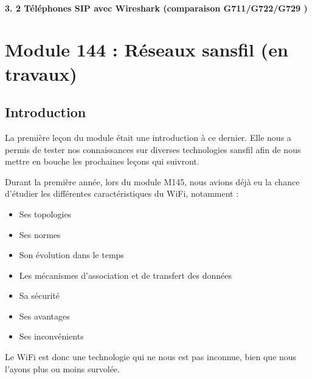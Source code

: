 \documentclass[letterpaper,10pt,french]{sphinxmanual}
\begin{document}
\subsubsection{3. 2 Téléphones SIP avec Wireshark (comparaison G711/G722/G729 )}
\label{\detokenize{Documentation-M362:telephones-sip-avec-wireshark-comparaison-g711-g722-g729}}
\sphinxstepscope


\chapter{Module 144 : Réseaux sans\sphinxhyphen{}fil (en travaux)}
\label{\detokenize{Documentation-M144:module-144-reseaux-sans-fil-en-travaux}}\label{\detokenize{Documentation-M144::doc}}

\section{Introduction}
\label{\detokenize{Documentation-M144:introduction}}
\sphinxAtStartPar
La première leçon du module était une introduction à ce dernier. Elle nous a permis de tester nos connaissances sur diverses technologies sans\sphinxhyphen{}fil afin de nous mettre en bouche les prochaines leçons qui suivront.

\sphinxAtStartPar
Durant la première année, lors du module M145, nous avions déjà eu la chance d’étudier les différentes caractéristiques du Wi\sphinxhyphen{}Fi, notamment :
\begin{itemize}
\item {} 
\sphinxAtStartPar
Ses topologies

\item {} 
\sphinxAtStartPar
Ses normes

\item {} 
\sphinxAtStartPar
Son évolution dans le temps

\item {} 
\sphinxAtStartPar
Les mécanismes d’association et de transfert des données

\item {} 
\sphinxAtStartPar
Sa sécurité

\item {} 
\sphinxAtStartPar
Ses avantages

\item {} 
\sphinxAtStartPar
Ses inconvénients

\end{itemize}

\sphinxAtStartPar
Le Wi\sphinxhyphen{}Fi est donc une technologie qui ne nous est pas inconnue, bien que nous l’ayons plus ou moins survolée.
\end{document}
